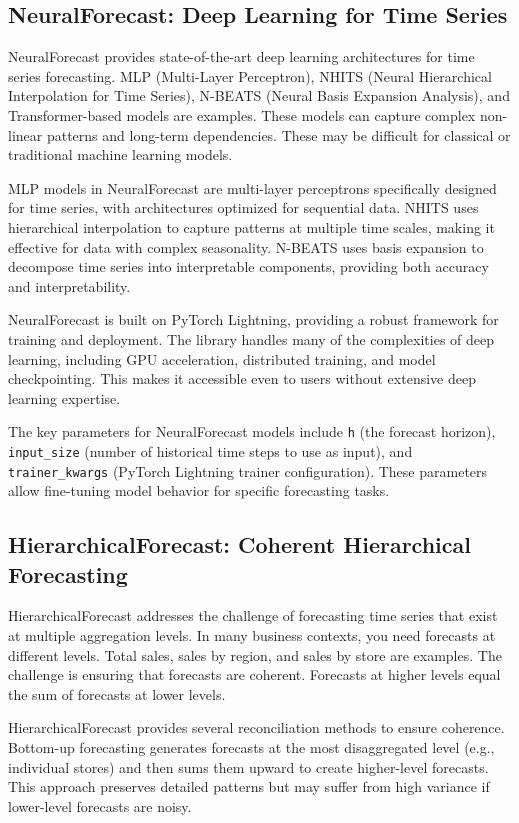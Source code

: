 \subsection{NeuralForecast: Deep Learning for Time Series}

NeuralForecast provides state-of-the-art deep learning architectures for time series forecasting. MLP (Multi-Layer Perceptron), NHITS (Neural Hierarchical Interpolation for Time Series), N-BEATS (Neural Basis Expansion Analysis), and Transformer-based models are examples. These models can capture complex non-linear patterns and long-term dependencies. These may be difficult for classical or traditional machine learning models.

MLP models in NeuralForecast are multi-layer perceptrons specifically designed for time series, with architectures optimized for sequential data. NHITS uses hierarchical interpolation to capture patterns at multiple time scales, making it effective for data with complex seasonality. N-BEATS uses basis expansion to decompose time series into interpretable components, providing both accuracy and interpretability.

NeuralForecast is built on PyTorch Lightning, providing a robust framework for training and deployment. The library handles many of the complexities of deep learning, including GPU acceleration, distributed training, and model checkpointing. This makes it accessible even to users without extensive deep learning expertise.

The key parameters for NeuralForecast models include \texttt{h} (the forecast horizon), \texttt{input\_size} (number of historical time steps to use as input), and \texttt{trainer\_kwargs} (PyTorch Lightning trainer configuration). These parameters allow fine-tuning model behavior for specific forecasting tasks.

\subsection{HierarchicalForecast: Coherent Hierarchical Forecasting}

HierarchicalForecast addresses the challenge of forecasting time series that exist at multiple aggregation levels. In many business contexts, you need forecasts at different levels. Total sales, sales by region, and sales by store are examples. The challenge is ensuring that forecasts are coherent. Forecasts at higher levels equal the sum of forecasts at lower levels.

HierarchicalForecast provides several reconciliation methods to ensure coherence. Bottom-up forecasting generates forecasts at the most disaggregated level (e.g., individual stores) and then sums them upward to create higher-level forecasts. This approach preserves detailed patterns but may suffer from high variance if lower-level forecasts are noisy.


